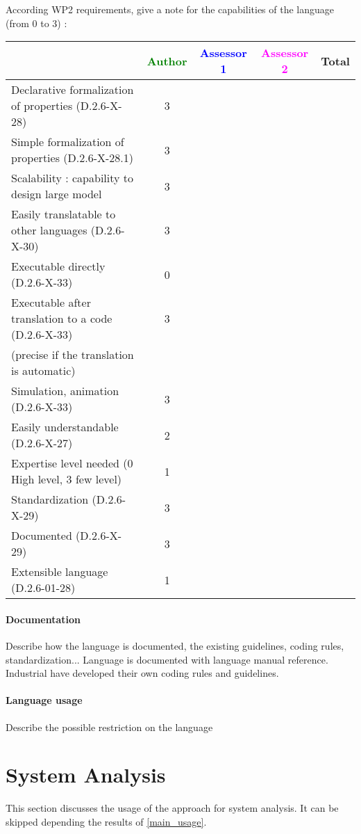 According WP2 requirements, give a note for the capabilities of the language (from 0 to 3) :

\begin{tabular}{|l | c | c | c | c|}
\hline
& \textcolor{green}{Author} & \textcolor{blue}{Assessor 1} & \textcolor{magenta}{Assessor 2} & Total \\
\hline
Declarative formalization of properties (D.2.6-X-28) & 3 & & & \\
\hline
Simple formalization of properties (D.2.6-X-28.1) & 3 & & & \\
\hline
Scalability : capability to design large model & 3 & & & \\
\hline
Easily translatable to other languages (D.2.6-X-30) & 3 & & & \\
\hline
Executable directly (D.2.6-X-33) & 0 & & & \\
\hline
Executable after translation to a code (D.2.6-X-33) & 3 & & & \\
(precise if the translation is automatic) & & & & \\
\hline
Simulation, animation (D.2.6-X-33) &  3 & & & \\
\hline
Easily understandable (D.2.6-X-27) & 2 & & & \\
\hline
Expertise level needed (0 High level, 3 few level) &  1 & & & \\
\hline
Standardization (D.2.6-X-29) & 3 & & & \\
\hline
Documented (D.2.6-X-29) & 3 & & & \\
\hline
Extensible language (D.2.6-01-28) & 1 & & & \\
\hline
\end{tabular}


\paragraph{Documentation} Describe how the language is documented, the existing guidelines, coding rules, standardization...
Language is documented with language manual reference. Industrial have developed their own coding rules and guidelines.

\paragraph{Language usage} Describe the possible restriction on the language

\section{System Analysis}
This section discusses the usage of the approach for system analysis.
It can be skipped depending the results of \ref{main_usage}.

